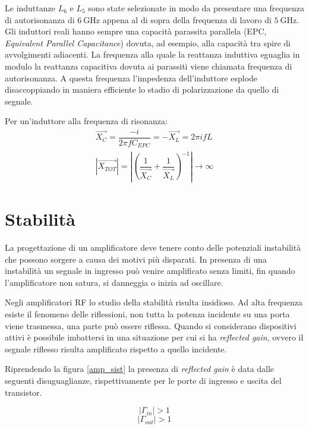 \documentclass[12pt,oneside]{book}
\begin{document}
Le induttanze $L_6$ e $L_5$ sono state selezionate in modo da presentare una frequenza di autorisonanza di $\SI{6}{\giga\hertz}$ appena al di sopra della frequenza di lavoro di $\SI{5}{\giga\hertz}$. Gli induttori reali hanno sempre una capacità parassita parallela (EPC, \textit{Equivalent Parallel Capacitance}) dovuta, ad esempio, alla capacità tra spire di avvolgimenti adiacenti. La frequenza alla quale la reattanza induttiva eguaglia in modulo la reattanza capacitiva dovuta ai parassiti viene chiamata frequenza di autorisonanza. A questa frequenza l'impedenza dell'induttore esplode disaccoppiando in maniera efficiente lo stadio di polarizzazione da quello di segnale.

Per un'induttore alla frequenza di risonanza:
\begin{equation}
    \begin{split}
        \vec{X_C}=\dfrac{-i}{2\pi f C_{EPC}}=-\vec{X_L}=2 \pi i f L\\
        \left|\vec{X_{TOT}}\right|=\left|\left(\dfrac{1}{\vec{X_C}}+\dfrac{1}{\vec{X_L}}\right)^{-1}\right|\to\infty 
    \end{split}
\end{equation} 

\section{Stabilità}
La progettazione di un amplificatore deve tenere conto delle potenziali instabilità che possono sorgere a causa dei motivi più disparati. In presenza di una instabilità un segnale in ingresso può venire amplificato senza limiti, fin quando l'amplificatore non satura, si danneggia o inizia ad oscillare.

Negli amplificatori RF lo studio della stabilità risulta insidioso. Ad alta frequenza esiste il fenomeno delle riflessioni, non tutta la potenza incidente su una porta viene trasmessa, una parte può essere riflessa. Quando si considerano dispositivi attivi è possibile imbattersi in una situazione per cui si ha \textit{reflected gain}, ovvero il segnale riflesso risulta amplificato rispetto a quello incidente.

Riprendendo la figura \ref{amp_sist} la presenza di \textit{reflected gain} è data dalle seguenti disuguaglianze, rispettivamente per le porte di ingresso e uscita del transistor.

\begin{equation}
    \left|\Gamma_{in}\right| > 1
\end{equation}
\begin{equation}
    \left|\Gamma_{out}\right| > 1
\end{equation}
\end{document}
